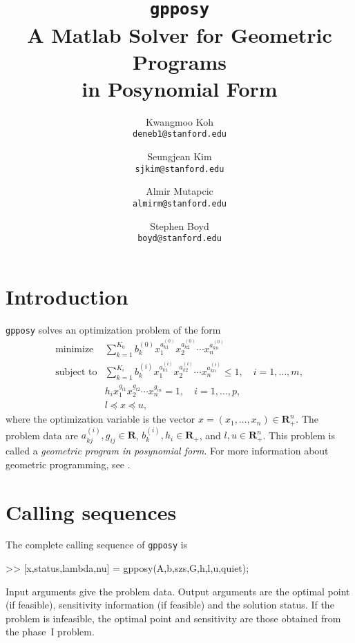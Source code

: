 \documentclass[12pt]{article}
\newcommand{\gpposy}{\texttt{gpposy}\xspace}
\newcommand{\reals}{{\mathbf R}}
\begin{document}
\title{\gpposy \\ A Matlab Solver for Geometric Programs \\ in Posynomial Form}

\author{ Kwangmoo Koh\\\texttt{deneb1@stanford.edu}
\and Seungjean Kim\\\texttt{sjkim@stanford.edu}
\and Almir Mutapcic\\\texttt{almirm@stanford.edu}
\and Stephen Boyd\\\texttt{boyd@stanford.edu}}

\maketitle

\section{Introduction}

\gpposy solves an optimization problem of the form
\begin{equation} \label{e-gp-posy}
\begin{array}{ll}
\mbox{minimize} & \sum_{k=1}^{K_0} b_k^{(0)} x_1^{a_{k1}^{(0)}} 
              x_2^{a_{k2}^{(0)}} \cdots x_n^{a_{kn}^{(0)}}\\
\mbox{subject to} & \sum_{k=1}^{K_i} b_k^{(i)} x_1^{a_{k1}^{(i)}} 
                x_2^{a_{k2}^{(i)}} \cdots x_n^{a_{kn}^{(i)}}
                \le 1, \quad i = 1, \ldots, m, \\
              & h_{i} x_1^{g_{i1}} x_2^{g_{i2}} \cdots x_n^{g_{in}}
                = 1, \quad i = 1, \ldots, p, \\
              & l \preceq x \preceq u,
\end{array}
\end{equation}
where the optimization variable is the vector 
$x = (x_1, \ldots, x_n) \in \reals_+^n$. The problem data are 
$a_{kj}^{(i)}, g_{ij} \in \reals$, $b_k^{(i)}, h_{i} \in \reals_+$, 
and $l, u \in \reals_+^{n}$. This problem is called a 
\emph{geometric program in posynomial form}.
For more information about geometric programming, see \cite{BV:04, BKVH:05}.

\section{Calling sequences}

The complete calling sequence of \gpposy is
\begin{code}
>> [x,status,lambda,nu] = gpposy(A,b,szs,G,h,l,u,quiet);
\end{code}
Input arguments give the problem data.
Output arguments are the optimal point (if feasible), sensitivity 
information (if feasible) and the solution status.
If the problem is infeasible, the optimal point and sensitivity
are those obtained from the phase~I problem.
\end{document}
